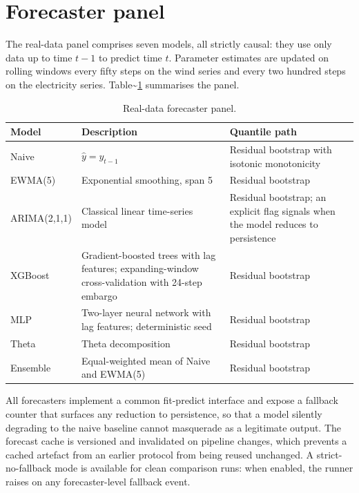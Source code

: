 \documentclass[
  11pt,
  a4paper,
  oneside]{report}
\begin{document}
\section{Forecaster panel}\label{forecaster-panel}

The real-data panel comprises seven models, all strictly causal: they
use only data up to time \(t - 1\) to predict time \(t\). Parameter
estimates are updated on rolling windows every fifty steps on the wind
series and every two hundred steps on the electricity series.
Table\textasciitilde{}\ref{tab:forecaster-panel} summarises the panel.

\begin{table}[h]
\centering
\small
\begin{tabular}{p{3.5cm}p{4.5cm}p{4.5cm}}
\toprule
Model & Description & Quantile path \\
\midrule
Naive & $\hat y = y_{t-1}$
  & Residual bootstrap with isotonic monotonicity \\
EWMA(5) & Exponential smoothing, span 5 & Residual bootstrap \\
ARIMA(2,1,1) & Classical linear time-series model
  & Residual bootstrap; an explicit flag
    signals when the model reduces to persistence \\
XGBoost & Gradient-boosted trees with lag features; expanding-window
  cross-validation with 24-step embargo
  \citep{bergmeir2018note, chen2016xgboost}
  & Residual bootstrap \\
MLP & Two-layer neural network with lag features; deterministic seed
  & Residual bootstrap \\
Theta & Theta decomposition \citep{assimakopoulos2000theta}
  & Residual bootstrap \\
Ensemble & Equal-weighted mean of Naive and EWMA(5)
  & Residual bootstrap \\
\bottomrule
\end{tabular}
\caption{Real-data forecaster panel.}
\label{tab:forecaster-panel}
\end{table}

All forecasters implement a common fit-predict interface and expose a
fallback counter that surfaces any reduction to persistence, so that a
model silently degrading to the naive baseline cannot masquerade as a
legitimate output. The forecast cache is versioned and invalidated on
pipeline changes, which prevents a cached artefact from an earlier
protocol from being reused unchanged. A strict-no-fallback mode is
available for clean comparison runs: when enabled, the runner raises on
any forecaster-level fallback event.
\end{document}
